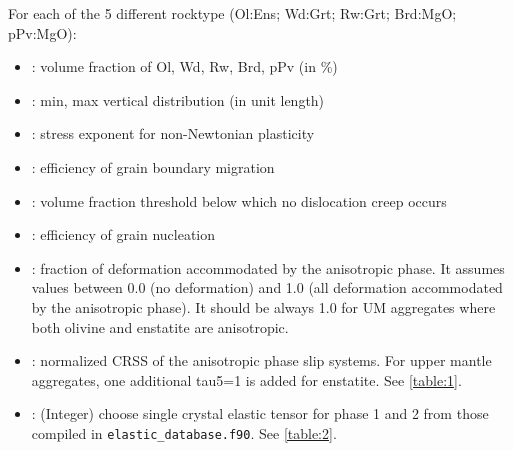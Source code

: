 
    For each of the 5 different rocktype (Ol:Ens; Wd:Grt; Rw:Grt\footnotemark; Brd:MgO; pPv:MgO\footnotemark):
\begin{itemize}
    \item {}: volume fraction of Ol, Wd, Rw, Brd, pPv (in \%)
    \item {}: min, max vertical distribution (in unit length)
    \item {}: stress exponent for non-Newtonian plasticity  
    \item {}: efficiency of grain boundary migration 
    \item {}: volume fraction threshold below which no dislocation creep occurs   
    \item {}: efficiency of grain nucleation
    \item {}: fraction of deformation accommodated by the anisotropic phase. It assumes values between 0.0 (no deformation) and 1.0 (all deformation accommodated by the anisotropic phase). It should be always 1.0 for UM aggregates where both olivine and enstatite are anisotropic.
    \item {}: normalized CRSS of the anisotropic phase slip systems. For upper mantle aggregates, one additional tau5=1 is added for enstatite. See \ref{table:1}.
    \item {}: (Integer) choose single crystal elastic tensor for phase 1 and 2 from those compiled in \texttt{elastic\_database.f90}. See \ref{table:2}.
\end{itemize}


\vspace{1cm}

